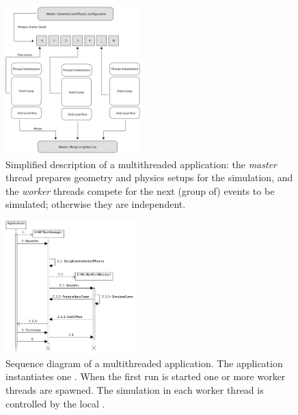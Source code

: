 \begin{figure}[htb]
\includegraphics[width=0.47\textwidth]{figures/MTSchema.pdf}
\caption{Simplified description of a \Gfour{} multithreaded application: the
        {\it master} thread prepares geometry and physics setups for the simulation,
        and the {\it worker} threads compete for the next (group of) events to be
        simulated; otherwise they are independent.}
\label{fig:MTschema}
\end{figure}

\begin{figure}[htb]
\includegraphics[width=0.45\textwidth]{figures/MTSimpleLife2A.pdf}
\caption{Sequence diagram of a multithreaded \Gfour{} application. The 
         application instantiates one .  When the 
         first run is started one or more worker threads are spawned. 
         The simulation in each worker thread is controlled by the local
         .}
\label{fig:MTlifecycle}
\end{figure}

